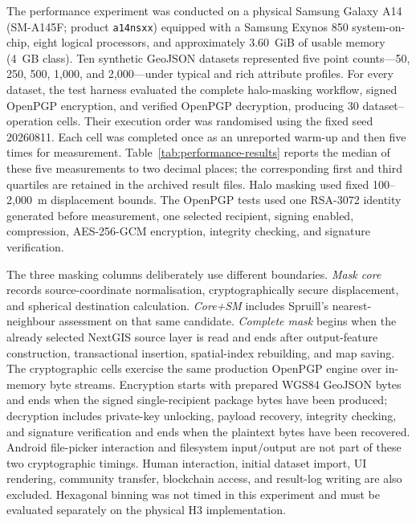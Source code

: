 \documentclass[]{interact}
\begin{document}
The performance experiment was conducted on a physical Samsung Galaxy A14 (SM-A145F; product \texttt{a14nsxx}) equipped with a Samsung Exynos 850 system-on-chip, eight logical processors, and approximately 3.60~GiB of usable memory (4~GB class). Ten synthetic GeoJSON datasets represented five point counts---50, 250, 500, 1,000, and 2,000---under typical and rich attribute profiles. For every dataset, the test harness evaluated the complete halo-masking workflow, signed OpenPGP encryption, and verified OpenPGP decryption, producing 30 dataset--operation cells. Their execution order was randomised using the fixed seed 20260811. Each cell was completed once as an unreported warm-up and then five times for measurement. Table~\ref{tab:performance-results} reports the median of these five measurements to two decimal places; the corresponding first and third quartiles are retained in the archived result files. Halo masking used fixed 100--2,000~m displacement bounds. The OpenPGP tests used one RSA-3072 identity generated before measurement, one selected recipient, signing enabled, compression, AES-256-GCM encryption, integrity checking, and signature verification.

The three masking columns deliberately use different boundaries. \emph{Mask core} records source-coordinate normalisation, cryptographically secure displacement, and spherical destination calculation. \emph{Core+SM} includes Spruill's nearest-neighbour assessment on that same candidate. \emph{Complete mask} begins when the already selected NextGIS source layer is read and ends after output-feature construction, transactional insertion, spatial-index rebuilding, and map saving. The cryptographic cells exercise the same production OpenPGP engine over in-memory byte streams. Encryption starts with prepared WGS84 GeoJSON bytes and ends when the signed single-recipient package bytes have been produced; decryption includes private-key unlocking, payload recovery, integrity checking, and signature verification and ends when the plaintext bytes have been recovered. Android file-picker interaction and filesystem input/output are not part of these two cryptographic timings. Human interaction, initial dataset import, UI rendering, community transfer, blockchain access, and result-log writing are also excluded. Hexagonal binning was not timed in this experiment and must be evaluated separately on the physical H3 implementation.
\end{document}
